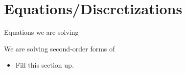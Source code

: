 \section{Equations/Discretizations}
\begin{frame}{Equations we are solving}
	\begin{block}{We are solving second-order forms of}
		\begin{itemize}
			\item Fill this section up.
		\end{itemize}
	\end{block}
\end{frame}
